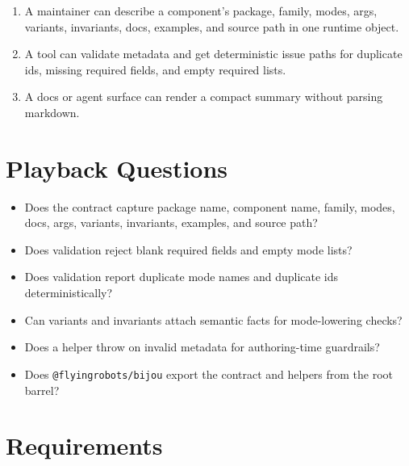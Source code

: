 \begin{enumerate}
\def\labelenumi{\arabic{enumi}.}
\tightlist
\item
  A maintainer can describe a component's package, family, modes, args, variants, invariants, docs, examples, and source path in one runtime object.
\item
  A tool can validate metadata and get deterministic issue paths for duplicate ids, missing required fields, and empty required lists.
\item
  A docs or agent surface can render a compact summary without parsing markdown.
\end{enumerate}

\section{Playback Questions}\label{record-125-playback-questions}

\begin{itemize}
\tightlist
\item
  Does the contract capture package name, component name, family, modes, docs, args, variants, invariants, examples, and source path?
\item
  Does validation reject blank required fields and empty mode lists?
\item
  Does validation report duplicate mode names and duplicate ids deterministically?
\item
  Can variants and invariants attach semantic facts for mode-lowering checks?
\item
  Does a helper throw on invalid metadata for authoring-time guardrails?
\item
  Does \texttt{@\allowbreak{}f\allowbreak{}l\allowbreak{}y\allowbreak{}i\allowbreak{}n\allowbreak{}g\allowbreak{}r\allowbreak{}o\allowbreak{}b\allowbreak{}o\allowbreak{}t\allowbreak{}s\allowbreak{}/\allowbreak{}b\allowbreak{}i\allowbreak{}j\allowbreak{}o\allowbreak{}u} export the contract and helpers from the root barrel?
\end{itemize}

\section{Requirements}\label{record-125-requirements}

